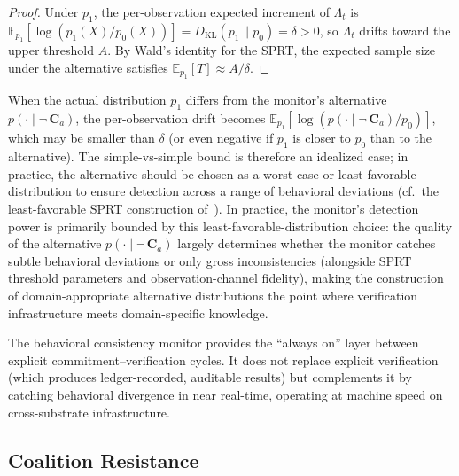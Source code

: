 \begin{proof}
Under $p_1$, the per-observation expected increment of $\Lambda_t$ is
$\mathbb{E}_{p_1}[\log(p_1(X)/p_0(X))] = D_{\mathrm{KL}}(p_1 \| p_0)
= \delta > 0$, so $\Lambda_t$ drifts toward the upper threshold $A$.
By Wald's identity for the SPRT, the expected sample size under the
alternative satisfies $\mathbb{E}_{p_1}[T] \approx A / \delta$.
\end{proof}

\begin{remark}
When the actual distribution $p_1$ differs from the monitor's
alternative $p(\cdot \mid \neg\,\mathbf{C}_a)$, the per-observation
drift becomes
$\mathbb{E}_{p_1}[\log(p(\cdot \mid \neg\,\mathbf{C}_a) / p_0)]$,
which may be smaller than $\delta$ (or even negative if $p_1$ is
closer to $p_0$ than to the alternative).  The simple-vs-simple
bound is therefore an idealized case; in practice, the alternative
should be chosen as a worst-case or least-favorable distribution
to ensure detection across a range of behavioral deviations
(cf.~the least-favorable SPRT construction
of~\citet{lasser2026scm}).  In practice, the monitor's detection
power is primarily bounded by this least-favorable-distribution
choice: the quality of the alternative
$p(\cdot \mid \neg\,\mathbf{C}_a)$ largely determines whether
the monitor catches subtle behavioral deviations or only gross
inconsistencies (alongside SPRT threshold parameters and
observation-channel fidelity), making the construction of
domain-appropriate alternative distributions the point where
verification infrastructure meets domain-specific knowledge.
\end{remark}

The behavioral consistency monitor provides the ``always on'' layer
between explicit commitment--verification cycles.  It does not replace
explicit verification (which produces ledger-recorded, auditable
results) but complements it by catching behavioral divergence in near
real-time, operating at machine speed on cross-substrate infrastructure.

\subsection{Coalition Resistance}
\label{sec:coalition_resistance}

